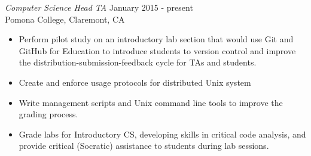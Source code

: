 {\sl Computer Science Head TA} \hfill January 2015 - present \\
Pomona College, Claremont, CA
\begin{itemize} \itemsep -2pt %
\item Perform pilot study on an introductory lab section that would use Git and GitHub for Education to introduce students to version control and improve the distribution-submission-feedback cycle for TAs and students.
\item Create and enforce usage protocols for distributed Unix system
\item Write management scripts and Unix command line tools to improve the grading process.
\item Grade labs for Introductory CS, developing skills in critical code analysis, and provide critical (Socratic) assistance to students during lab sessions.
\end{itemize}
